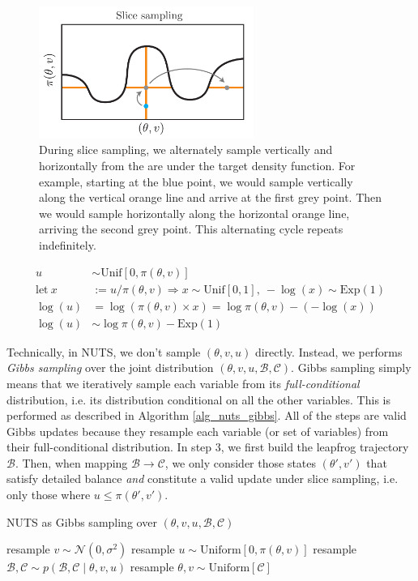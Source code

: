 \documentclass[12pt]{article}
\begin{document}
\begin{figure}[h]
\centering
\includegraphics[width=7cm]{illustrations/slice_sampling.pdf}
\caption{During slice sampling, we alternately sample vertically and horizontally from the are under the target density function. For example, starting at the blue point, we would sample vertically along the vertical orange line and arrive at the first grey point. Then we would sample horizontally along the horizontal orange line, arriving the second grey point. This alternating cycle repeats indefinitely.}
\label{fig_slice_sampling}
\end{figure}


\begin{align}
u &\sim \text{Unif}[0, \pi(\theta, v)] \\
\text{let} \ x &:= u/\pi(\theta, v) \Rightarrow x \sim \text{Unif}[0, 1], \  -\log(x) \sim \text{Exp}(1) \\
\log(u) &= \log(\pi(\theta, v) \times x) = \log\pi(\theta, v) - (-\log(x)) \\
\log(u) &\sim \log \pi(\theta, v) - \text{Exp}(1)
\end{align}
\label{eq_logu_distr}

Technically, in NUTS, we don't sample $(\theta,v,u)$ directly. Instead, we performs \textit{Gibbs sampling} over the joint distribution $(\theta, v, u, \mathcal{B}, \mathcal{C})$. Gibbs sampling simply means that we iteratively sample each variable from its \textit{full-conditional} distribution, i.e. its distribution conditional on all the other variables. This is performed as described in Algorithm \ref{alg_nuts_gibbs}. All of the steps are valid Gibbs updates because they resample each variable (or set of variables) from their full-conditional distribution. In step 3, we first build the leapfrog trajectory $\mathcal{B}$. Then, when mapping $\mathcal{B} \rightarrow \mathcal{C}$, we only consider those states $(\theta', v')$ that satisfy detailed balance \textit{and} constitute a valid update under slice sampling, i.e. only those where $u \leq \pi(\theta', v')$.

\begin{algorithm}
\caption{NUTS as Gibbs sampling over $(\theta, v, u, \mathcal{B}, \mathcal{C})$}
\label{alg_nuts_gibbs}
\begin{algorithmic}
\State resample $v \sim \mathcal{N}(0, \sigma^2)$
\State resample $u \sim \text{Uniform} [0, \pi(\theta, v)]$
\State resample $\mathcal{B}, \mathcal{C} \sim p(\mathcal{B}, \mathcal{C} \mid \theta, v, u)$
\State resample $\theta, v \sim \text{Uniform}[\mathcal{C}]$
\end{algorithmic}
\end{algorithm}
\end{document}
